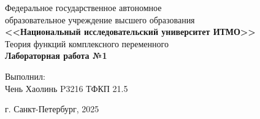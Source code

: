 \begin{titlepage}
    \centering
    Федеральное государственное автономное \\
    образовательное учреждение высшего образования \\
    \textbf{<<Национальный исследовательский университет ИТМО>>} \\

    \vfill
    Теория функций комплексного переменного \\
    \vspace{0.5\baselineskip}
    \textbf{Лабораторная работа №1} \\


    \vfill

    \flushright
    Выполнил:\\ 
    Чень Хаолинь P3216 ТФКП 21.5\\

    \vspace{4\baselineskip}
    
    \centering
    г. Санкт-Петербург, 2025

\end{titlepage}